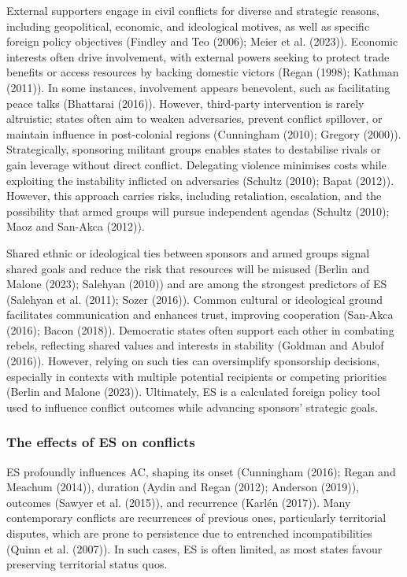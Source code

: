 \documentclass[
]{article}
\begin{document}
External supporters engage in civil conflicts for diverse and strategic
reasons, including geopolitical, economic, and ideological motives, as
well as specific foreign policy objectives (Findley and Teo (2006);
Meier et al. (2023)). Economic interests often drive involvement, with
external powers seeking to protect trade benefits or access resources by
backing domestic victors (Regan (1998); Kathman (2011)). In some
instances, involvement appears benevolent, such as facilitating peace
talks (Bhattarai (2016)). However, third-party intervention is rarely
altruistic; states often aim to weaken adversaries, prevent conflict
spillover, or maintain influence in post-colonial regions (Cunningham
(2010); Gregory (2000)). Strategically, sponsoring militant groups
enables states to destabilise rivals or gain leverage without direct
conflict. Delegating violence minimises costs while exploiting the
instability inflicted on adversaries (Schultz (2010); Bapat (2012)).
However, this approach carries risks, including retaliation, escalation,
and the possibility that armed groups will pursue independent agendas
(Schultz (2010); Maoz and San-Akca (2012)).

Shared ethnic or ideological ties between sponsors and armed groups
signal shared goals and reduce the risk that resources will be misused
(Berlin and Malone (2023); Salehyan (2010)) and are among the strongest
predictors of ES (Salehyan et al. (2011); Sozer (2016)). Common cultural
or ideological ground facilitates communication and enhances trust,
improving cooperation (San-Akca (2016); Bacon (2018)). Democratic states
often support each other in combating rebels, reflecting shared values
and interests in stability (Goldman and Abulof (2016)). However, relying
on such ties can oversimplify sponsorship decisions, especially in
contexts with multiple potential recipients or competing priorities
(Berlin and Malone (2023)). Ultimately, ES is a calculated foreign
policy tool used to influence conflict outcomes while advancing
sponsors' strategic goals.

\subsubsection{The effects of ES on
conflicts}\label{the-effects-of-es-on-conflicts}

ES profoundly influences AC, shaping its onset (Cunningham (2016); Regan
and Meachum (2014)), duration (Aydin and Regan (2012); Anderson (2019)),
outcomes (Sawyer et al. (2015)), and recurrence (Karlén (2017)). Many
contemporary conflicts are recurrences of previous ones, particularly
territorial disputes, which are prone to persistence due to entrenched
incompatibilities (Quinn et al. (2007)). In such cases, ES is often
limited, as most states favour preserving territorial status quos.
\end{document}
